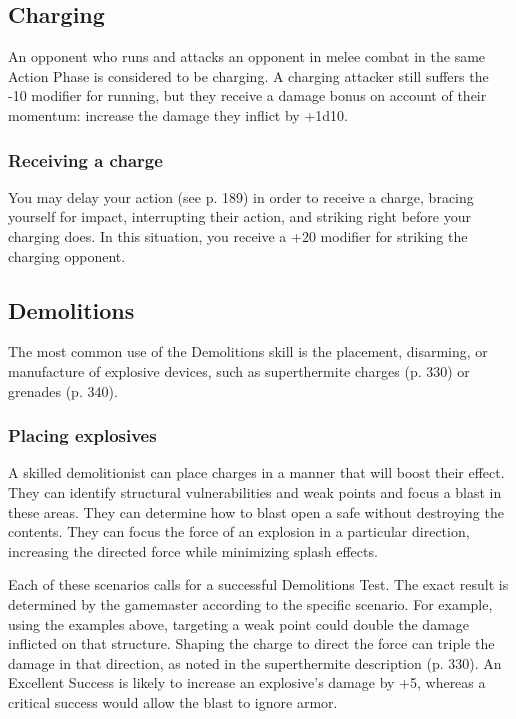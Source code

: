 \subsection{Charging} \label{sec:charging} 

An opponent who runs and attacks an opponent in melee combat in the same Action Phase is considered to be charging. A charging attacker still suffers the -10 modifier for running, but they receive a damage bonus on account of their momentum: increase the damage they inflict by +1d10. 

\subsubsection{Receiving a charge} 

You may delay your action (see p. 189) in order to receive a charge, bracing yourself for impact, interrupting their action, and striking right before your charging does. In this situation, you receive a +20 modifier for striking the charging opponent. 



\subsection{Demolitions} \label{sec:demolitions} 

The most common use of the Demolitions skill is the placement, disarming, or manufacture of explosive devices, such as superthermite charges (p. 330) or grenades (p. 340). 

\subsubsection{Placing explosives} 

A skilled demolitionist can place charges in a manner that will boost their effect. They can identify structural vulnerabilities and weak points and focus a blast in these areas. They can determine how to blast open a safe without destroying the contents. They can focus the force of an explosion in a particular direction, increasing the directed force while minimizing splash effects. 

Each of these scenarios calls for a successful Demolitions Test. The exact result is determined by the gamemaster according to the specific scenario. For example, using the examples above, targeting a weak point could double the damage inflicted on that structure. Shaping the charge to direct the force can triple the damage in that direction, as noted in the superthermite description (p. 330). An Excellent Success is likely to increase an explosive’s damage by +5, whereas a critical success would allow the blast to ignore armor. 

